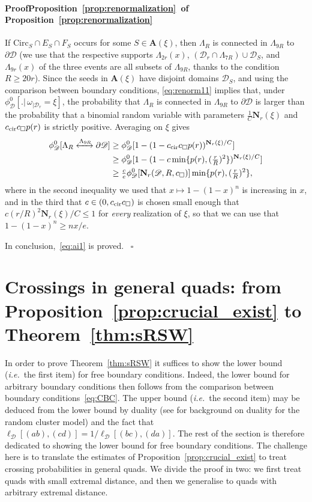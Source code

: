 \documentclass[a4paper,oneside,11pt]{article}
\numberwithin{equation}{section}
\numberwithin{equation}{section}
\numberwithin{equation}{section}
\newenvironment{proof}[1][\relax]%
  {\paragraph{Proof\ifx#1\relax\else~of #1\fi}}%
  {~\hfill$\square$\par\bigskip}
\newcommand{\calD}{\mathcal{D}}
\newcommand{\Circ}{\mathrm{Circ}}
\begin{document}
\begin{proof}[Proposition~\ref{prop:renormalization}]
If $\Circ_S\cap E_S\cap F_S$ occurs for some $S\in\mathbf A(\xi)$, then $\Lambda_R$  is connected in $\Lambda_{9R}$  to $\partial\calD$ (we use that the respective supports $\Lambda_{2r}(x)$, $(\calD_r\cap\Lambda_{7R})\cup\calD_S$, and $\Lambda_{9r}(x)$ of the three events are all subsets of  $\Lambda_{9R}$, thanks to the condition $R\ge 20r$). 
Since the seeds in $\mathbf A(\xi)$ have disjoint domains $\calD_S$, and using the comparison between boundary conditions, 
\eqref{eq:renorm11} implies that, under $\phi_{\calD}^0[.|\, \omega_{|\calD_r}=\xi]$,
the probability that $\Lambda_{R}$ is connected in $\Lambda_{9R}$ to $\partial\calD$ is larger than 
the probability that a binomial random variable with parameters $\frac1C\mathbf N_r(\xi)$ and $c_{\rm cir}c_\square p(r)$ is strictly positive.
Averaging on $\xi$ gives
\begin{align*}
\phi_\calD^0 [\Lambda_R\xleftrightarrow{\Lambda_{9R}}   \partial\calD]&\ge \phi_\calD^0[1-(1-c_{\rm cir}c_\square p(r))^{\mathbf N_r(\xi)/C}]\\
&\ge \phi_\calD^0[1-(1-c\min\{p(r),(\tfrac rR)^2\})^{\mathbf N_r(\xi)/C}]\\
&\ge \tfrac{c}{e}\phi_\calD^0[\mathbf N_r(\calD,R,c_\square)]\min\{p(r),(\tfrac rR)^2\} ,
\end{align*}
where in the second inequality we used that $x\mapsto 1-(1-x)^n$ is increasing in $x$, and in the third that $c\in(0,c_{\rm cir}c_\square)$ is chosen small enough that $c(r/R)^2\mathbf N_r(\xi)/C \leq 1$ for {\em every} realization of $\xi$, so that we can use that $1-(1-x)^n\ge nx/e$.

In conclusion,~\eqref{eq:ai1} is proved. 
\end{proof}

\section{Crossings in general quads: from Proposition~\ref{prop:crucial_exist} to Theorem~\ref{thm:sRSW}}\label{sec:3.3}

In order to prove Theorem~\ref{thm:sRSW} it suffices to show the lower bound (\emph{i.e.}~the first item) for free boundary conditions. Indeed, the lower bound for arbitrary boundary conditions then follows from the comparison between boundary conditions~\eqref{eq:CBC}. The upper bound (\emph{i.e.}~the second item) may be deduced from the lower bound by duality (see \cite{Gri06} for background on duality for the random cluster model) and the fact that $\ell_\calD[(ab),(cd)]=1/\ell_\calD[(bc),(da)]$. The rest of the section is therefore dedicated to showing the lower bound for free boundary conditions. 
The challenge here is to translate the estimates of Proposition~\ref{prop:crucial_exist} to treat crossing probabilities in general quads. 
We divide the proof in two: we first treat quads with small extremal distance, and then we generalise to quads with arbitrary extremal distance. 
\end{document}
